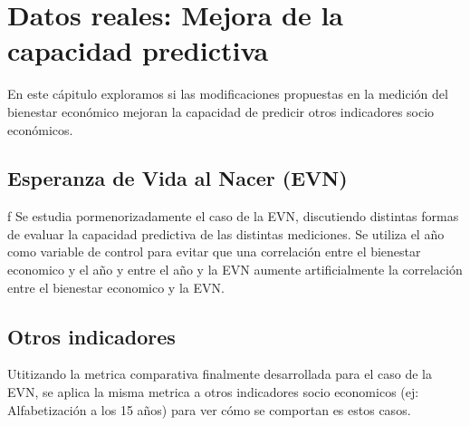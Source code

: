 \chapter{Datos reales: Mejora de la capacidad predictiva} \label{chapter:datos_reales_otros_indicadores}

En este cápitulo exploramos si las modificaciones propuestas en la medición del bienestar económico mejoran la capacidad de predicir otros indicadores socio económicos.

\section{Esperanza de Vida al Nacer (EVN)}
f
Se estudia pormenorizadamente el caso de la EVN, discutiendo distintas formas de evaluar la capacidad predictiva de las distintas mediciones. Se utiliza el año como variable de control para evitar que una correlación entre el bienestar economico y el año y entre el año y la EVN aumente artificialmente la correlación entre el bienestar economico y la EVN.


\section{Otros indicadores}

Utitizando la metrica comparativa finalmente desarrollada para el caso de la EVN, se aplica la misma metrica a otros indicadores socio economicos (ej: Alfabetización a los 15 años) para ver cómo se comportan es estos casos.